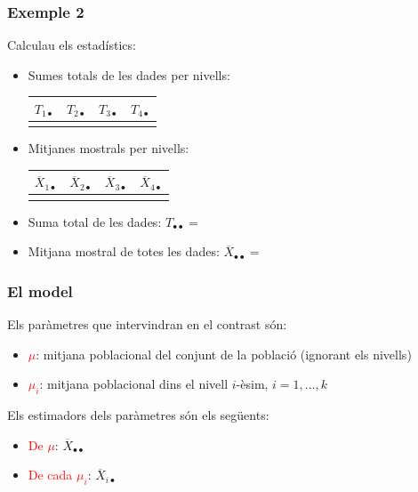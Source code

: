\documentclass[12pt,t]{beamer}
\newcommand{\red}[1]{\textcolor{red}{#1}}
\theoremstyle{plain}
\theoremstyle{definition}
\begin{document}
\begin{frame}
\frametitle{Exemple 2}
Calculau els estadístics:
\begin{itemize}
\item Sumes totals de les dades per nivells:
\begin{center}
\begin{tabular}{c|c|c|c}
\quad${T_{1\bullet}}$\quad{} & \quad${T_{2\bullet}}$\quad{} & \quad${T_{3\bullet}}$\quad{} & \quad${T_{4\bullet}}$\quad{} \\
\hline
 &
 &
 & 
\end{tabular}
\end{center}
\medskip

\item Mitjanes mostrals per nivells:
\begin{center}
\begin{tabular}{c|c|c|c}
\quad${\overline{X}_{1\bullet}}$\quad{} & \quad${\overline{X}_{2\bullet}}$\quad{} & \quad${\overline{X}_{3\bullet}}$\quad{} & \quad${\overline{X}_{4\bullet}}$\quad{} \\
\hline
&
&
&
\end{tabular}
\end{center}
\medskip

\item Suma total de les dades: $T_{\bullet\bullet}=$
\medskip



\item Mitjana mostral de totes les dades: $\overline{X}_{\bullet\bullet}=$

\end{itemize}

\end{frame}



\begin{frame}
\frametitle{El model}
Els paràmetres que intervindran en el contrast són:
\begin{itemize}
\item \red{$\mu$}: mitjana poblacional  del conjunt de la població  (ignorant els nivells)
\medskip

\item \red{$\mu_i$}: mitjana poblacional dins el nivell $i$-èsim,
$i=1,\ldots,k$
\medskip
\end{itemize}
\medskip

Els estimadors dels paràmetres són els següents:
\begin{itemize}
\item \red{De $\mu$}: $\overline{X}_{\bullet\bullet}$
\medskip

\item \red{De cada $\mu_i$}: $\overline{X}_{i\bullet}$
\end{itemize}

\end{frame}
\end{document}
